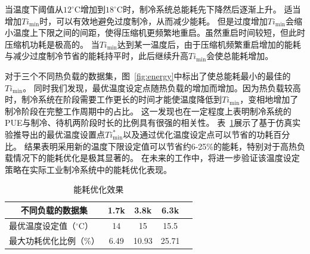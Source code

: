 当温度下阈值从${12}^{\circ} \mathrm{C}$增加到${18}^{\circ} \mathrm{C}$时，制冷系统总能耗先下降然后逐渐上升。
适当增加$Ti_{\min}$时，可以有效地避免过度制冷，从而减少能耗。
但是过度增加$Ti_{\min}$会缩小温度上下限之间的间距，使得压缩机更频繁地重启。虽然重启时间较短，但此时压缩机功耗是极高的。
当$Ti_{\min}$达到某一温度后，由于压缩机频繁重启增加的能耗与减少过度制冷节省的能耗持平时，此后继续升高$Ti_{\min}$会使总能耗增加。

对于三个不同热负载的数据集，图~\ref{fig:energy}中标出了使总能耗最小的最佳的$Ti_{\min}$。
同时我们发现，最优温度设定点随热负载的增加而增加。因为热负载较高时，制冷系统在阶段需要工作更长的时间才能使温度降低到$Ti_{\min}$，变相地增加了制冷阶段在完整工作周期中的占比。
这一发现也在一定程度上表明制冷系统的PUE与制冷、待机两阶段时长的比例具有很强的相关性。
表~\ref{tab:power_save_percent}展示了基于仿真实验推导出的最优温度设置点$Ti^*_{\min}$以及通过优化温度设定点可以节省的功耗百分比。
结果表明采用新的温度下限设定值可以节省约6-25\%的能耗，特别对于高热负载情况下的能耗优化是极其显著的。
在未来的工作中，将进一步验证该温度设定策略在实际工业制冷系统中的能耗优化表现。
\begin{table}[]
    \centering
    \caption{能耗优化效果}
    \label{tab:power_save_percent}
    \begin{tabular}{lcccc}
    \hline
    \multicolumn{1}{c}{\textbf{不同负载的数据集}} & 1.7k  & 3.8k    & 6.3k  \\ \hline
    最优温度设定值（${ }^{\circ} \mathrm{C}$）               & 14   & 15     & 15.5    \\
    最大功耗优化比例（\%）              & 6.49 & 10.93  & 25.71\\ \hline
    \end{tabular}
    \end{table}
